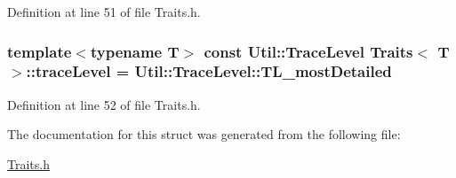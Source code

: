 Definition at line 51 of file Traits.\-h.

\hypertarget{struct_traits_a032499d15672915dd3349e6cc0e9c673}{
\subsubsection[{trace\-Level}]{\setlength{\rightskip}{0pt plus 5cm}template$<$typename T$>$ const {\bf Util\-::\-Trace\-Level} {\bf Traits}$<$ T $>$\-::trace\-Level = Util\-::\-Trace\-Level\-::\-T\-L\-\_\-most\-Detailed\hspace{0.3cm}{\ttfamily [static]}}}\label{struct_traits_a032499d15672915dd3349e6cc0e9c673}


Definition at line 52 of file Traits.\-h.



The documentation for this struct was generated from the following file\-:\begin{DoxyCompactItemize}
\item 
\hyperlink{_traits_8h}{Traits.\-h}\end{DoxyCompactItemize}
